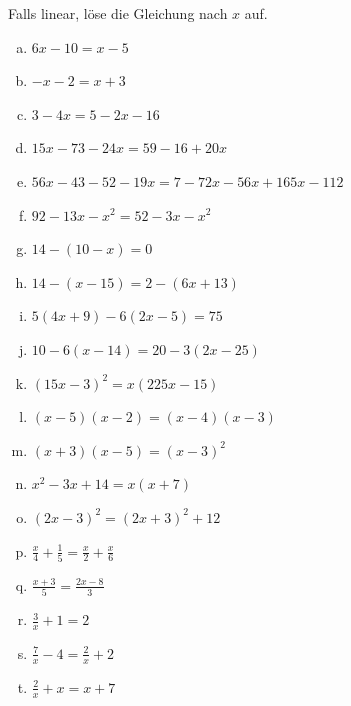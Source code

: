 \documentclass[%
11pt,%
twoside,%
titlepage,%
german,%
headsepline%
]{scrartcl}
\begin{document}
\begin{ueb} Falls linear, löse die Gleichung nach $x$ auf.
                \begin{enumerate}[a)]
                                \item $6x-10=x-5$
                                \item $-x-2=x+3$
                                \item $3-4x=5-2x-16$
                                \item $15x-73-24x=59-16+20x$
                                \item $56x-43-52-19x=7-72x-56x+165x-112$
                                \item $92-13x-x^2=52-3x-x^2$
                                \item $14-(10-x)=0$
                                \item $14-(x-15)=2-(6x+13)$
                                \item $5(4x+9)-6(2x-5)=75$
                                \item $10-6(x-14)=20-3(2x-25)$
                                \item $(15x-3)^2=x(225x-15)$
                                \item $(x-5)(x-2)=(x-4)(x-3)$
                                \item $(x+3)(x-5)=(x-3)^2$
                                \item $x^2-3x+14=x(x+7)$
                                \item $(2x-3)^2=(2x+3)^2+12$
                                \item $\frac{x}{4}+\frac{1}{5}=\frac{x}{2}+\frac{x}{6}$
                                \item $\frac{x+3}{5}=\frac{2x-8}{3}$
                                \item $\frac{3}{x}+1 = 2$
                                \item $\frac{7}{x}-4 = \frac{2}{x}+2$
                                \item $\frac{2}{x}+x = x+7$  
                \end{enumerate}
\end{ueb}
\end{document}
